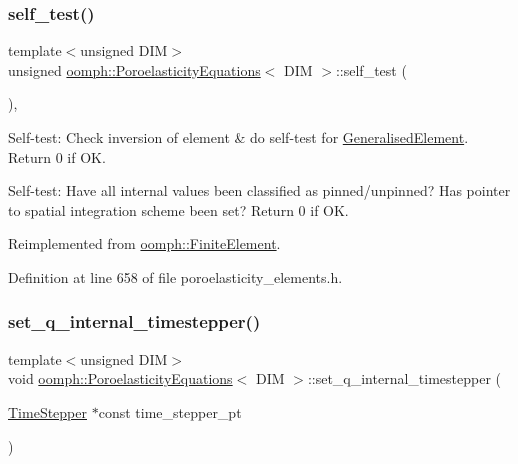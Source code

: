 \subsubsection{\texorpdfstring{self\+\_\+test()}{self\_test()}}
{\footnotesize\ttfamily template$<$unsigned D\+IM$>$ \\
unsigned \hyperlink{classoomph_1_1PoroelasticityEquations}{oomph\+::\+Poroelasticity\+Equations}$<$ D\+IM $>$\+::self\+\_\+test (\begin{DoxyParamCaption}{ }\end{DoxyParamCaption})\hspace{0.3cm}{\ttfamily [inline]}, {\ttfamily [virtual]}}



Self-\/test\+: Check inversion of element \& do self-\/test for \hyperlink{classoomph_1_1GeneralisedElement}{Generalised\+Element}. Return 0 if OK. 

Self-\/test\+: Have all internal values been classified as pinned/unpinned? Has pointer to spatial integration scheme been set? Return 0 if OK. 

Reimplemented from \hyperlink{classoomph_1_1FiniteElement_af94c5a5e22175d5420b33b3b79e46ed3}{oomph\+::\+Finite\+Element}.



Definition at line 658 of file poroelasticity\+\_\+elements.\+h.

\mbox{\label{classoomph_1_1PoroelasticityEquations_a9fe9f9e43dd7a2f93753c5d0e882b2c8}} 
\subsubsection{\texorpdfstring{set\+\_\+q\+\_\+internal\+\_\+timestepper()}{set\_q\_internal\_timestepper()}}
{\footnotesize\ttfamily template$<$unsigned D\+IM$>$ \\
void \hyperlink{classoomph_1_1PoroelasticityEquations}{oomph\+::\+Poroelasticity\+Equations}$<$ D\+IM $>$\+::set\+\_\+q\+\_\+internal\+\_\+timestepper (\begin{DoxyParamCaption}\item[{\hyperlink{classoomph_1_1TimeStepper}{Time\+Stepper} $\ast$const}]{time\+\_\+stepper\+\_\+pt }\end{DoxyParamCaption})\hspace{0.3cm}{\ttfamily [inline]}}



